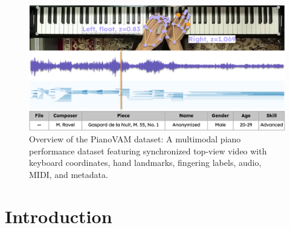 \documentclass{article}
\begin{document}
\begin{figure}
    \centering
    \includegraphics[width=1\linewidth]{Images/teaser_image.png}
    \caption{Overview of the PianoVAM dataset: A multimodal piano performance dataset featuring synchronized top-view video with keyboard coordinates, hand landmarks, fingering labels, audio, MIDI, and metadata.}
    \label{fig:enter-label}
\vspace{-5mm}    
\end{figure}

\section{Introduction}\label{sec:introduction}

\end{document}
